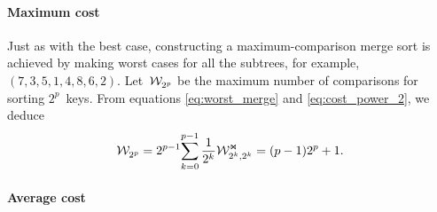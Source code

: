 \paragraph{Maximum cost}

Just as with the best case, constructing a maximum\hyp{}comparison
merge sort is achieved by making worst cases for all the subtrees, for
example, \((7,3,5,1,4,8,6,2)\). Let~\(\mathcal{W}_{2^p}^{}\) be the maximum
number of comparisons for sorting \(2^p\)~keys. From equations
\eqref{eq:worst_merge} and \eqref{eq:cost_power_2}, we deduce
\begin{equation}
\belowdisplayskip=0pt
\W{}{2^p}
  = 2^{p-1}\!\sum_{k=0}^{p-1}{\frac{1}{2^k}\W{\Join}{2^k,2^k}}
  = (p-1)2^p + 1.
\label{eq:worst_power}
\end{equation}

\paragraph{Average cost}

